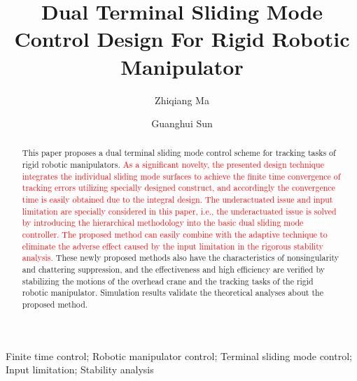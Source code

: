 \documentclass[3p]{elsarticle}
\theoremstyle{plain}
\theoremstyle{remark}
\begin{document}
\begin{frontmatter}
\title{Dual Terminal Sliding Mode Control Design For Rigid Robotic Manipulator}
\author{Zhiqiang Ma}
\author{Guanghui Sun}
\address{Research Institute of Intelligent Control and Systems, Harbin Institute of Technology, Harbin 150001, China}

\begin{abstract}

This paper proposes a dual terminal sliding mode control scheme for tracking tasks of rigid robotic manipulators. \textcolor{red}{As a significant novelty, the presented design technique integrates the individual sliding mode  surfaces to achieve the finite time convergence of tracking errors utilizing specially designed construct, and accordingly the convergence time is easily obtained due to the integral design. The underactuated issue and input limitation are specially considered in this paper, i.e., the underactuated issue is solved by introducing the hierarchical methodology into the basic dual sliding mode controller. The proposed method can easily combine with the adaptive technique to  eliminate the adverse effect caused by the input limitation in the rigorous stability analysis.} These newly proposed methods also have the characteristics of nonsingularity and chattering suppression, and the effectiveness and high efficiency are verified by stabilizing the motions of the overhead crane and the tracking tasks of the rigid robotic manipulator. Simulation results validate the theoretical analyses about the proposed method.

\end{abstract}
\begin{keyword}
Finite time control; Robotic manipulator control; Terminal sliding mode control; Input limitation; Stability analysis
\end{keyword}
\end{frontmatter}
\end{document}
